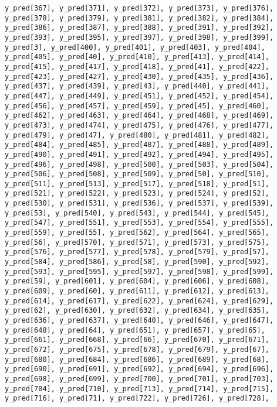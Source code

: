 \documentclass[
  letterpaper,
  DIV=11,
  numbers=noendperiod]{scrartcl}
\begin{document}
\begin{verbatim}
y_pred[367], y_pred[371], y_pred[372], y_pred[373], y_pred[376],
y_pred[378], y_pred[379], y_pred[381], y_pred[382], y_pred[384],
y_pred[386], y_pred[387], y_pred[388], y_pred[391], y_pred[392],
y_pred[393], y_pred[395], y_pred[397], y_pred[398], y_pred[399],
y_pred[3], y_pred[400], y_pred[401], y_pred[403], y_pred[404],
y_pred[405], y_pred[40], y_pred[410], y_pred[413], y_pred[414],
y_pred[415], y_pred[417], y_pred[418], y_pred[41], y_pred[422],
y_pred[423], y_pred[427], y_pred[430], y_pred[435], y_pred[436],
y_pred[437], y_pred[439], y_pred[43], y_pred[440], y_pred[441],
y_pred[447], y_pred[449], y_pred[451], y_pred[452], y_pred[454],
y_pred[456], y_pred[457], y_pred[459], y_pred[45], y_pred[460],
y_pred[462], y_pred[463], y_pred[464], y_pred[468], y_pred[469],
y_pred[473], y_pred[474], y_pred[475], y_pred[476], y_pred[477],
y_pred[479], y_pred[47], y_pred[480], y_pred[481], y_pred[482],
y_pred[484], y_pred[485], y_pred[487], y_pred[488], y_pred[489],
y_pred[490], y_pred[491], y_pred[492], y_pred[494], y_pred[495],
y_pred[496], y_pred[498], y_pred[500], y_pred[503], y_pred[504],
y_pred[506], y_pred[508], y_pred[509], y_pred[50], y_pred[510],
y_pred[511], y_pred[513], y_pred[517], y_pred[518], y_pred[51],
y_pred[521], y_pred[522], y_pred[523], y_pred[524], y_pred[52],
y_pred[530], y_pred[531], y_pred[536], y_pred[537], y_pred[539],
y_pred[53], y_pred[540], y_pred[543], y_pred[544], y_pred[545],
y_pred[547], y_pred[551], y_pred[553], y_pred[554], y_pred[555],
y_pred[559], y_pred[55], y_pred[562], y_pred[564], y_pred[565],
y_pred[56], y_pred[570], y_pred[571], y_pred[573], y_pred[575],
y_pred[576], y_pred[577], y_pred[578], y_pred[579], y_pred[57],
y_pred[584], y_pred[586], y_pred[58], y_pred[590], y_pred[592],
y_pred[593], y_pred[595], y_pred[597], y_pred[598], y_pred[599],
y_pred[59], y_pred[601], y_pred[604], y_pred[606], y_pred[608],
y_pred[609], y_pred[60], y_pred[611], y_pred[612], y_pred[613],
y_pred[614], y_pred[617], y_pred[622], y_pred[624], y_pred[629],
y_pred[62], y_pred[630], y_pred[632], y_pred[634], y_pred[635],
y_pred[636], y_pred[637], y_pred[640], y_pred[646], y_pred[647],
y_pred[648], y_pred[64], y_pred[651], y_pred[657], y_pred[65],
y_pred[661], y_pred[668], y_pred[66], y_pred[670], y_pred[671],
y_pred[672], y_pred[675], y_pred[678], y_pred[679], y_pred[67],
y_pred[680], y_pred[684], y_pred[686], y_pred[689], y_pred[68],
y_pred[690], y_pred[691], y_pred[692], y_pred[694], y_pred[696],
y_pred[698], y_pred[699], y_pred[700], y_pred[701], y_pred[703],
y_pred[704], y_pred[710], y_pred[713], y_pred[714], y_pred[715],
y_pred[716], y_pred[71], y_pred[722], y_pred[726], y_pred[728],

\end{verbatim}
\end{document}
